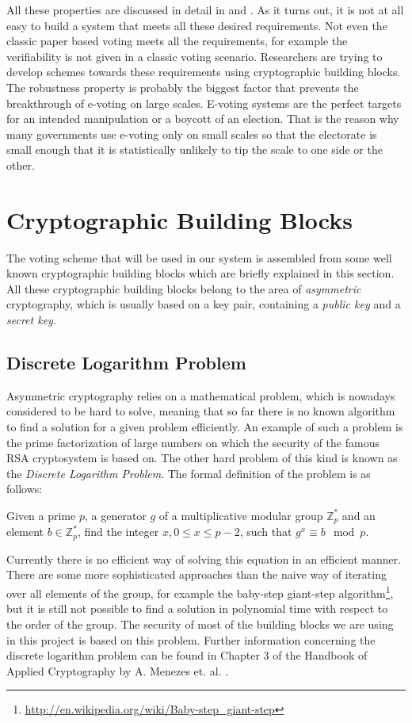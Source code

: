 \documentclass[numbers=noenddot, abstract=on, a4paper, headsepline,
footsepline, oneside, draft=off]{scrreprt}
\begin{document}
All these properties are discussed in detail in \cite{HS11} and \cite{Jonker09}.
As it turns out, it is not at all easy to build a system that meets all these
desired requirements. Not even the classic paper based voting meets all the
requirements, for example the verifiability is not given in a classic voting
scenario. Researchers are trying to develop schemes towards these requirements
using cryptographic building blocks. The robustness property is probably the
biggest factor that prevents the breakthrough of e-voting on large scales.
E-voting systems are the perfect targets for an intended manipulation or a
boycott of an election. That is the reason why many governments use e-voting
only on small scales so that the electorate is small enough that it is
statistically unlikely to tip the scale to one side or the other.

\section{Cryptographic Building Blocks}
\label{sec:buildingblocks}
The voting scheme that will be used in our system is assembled from some well
known cryptographic building blocks which are briefly explained in this section.
All these cryptographic building blocks belong to the area of \emph{asymmetric}
cryptography, which is usually based on a key pair, containing a
\emph{public key} and a \emph{secret key}.

\subsection{Discrete Logarithm Problem}
\label{sec:discretelogarithm}
Asymmetric cryptography relies on a mathematical problem, which is nowadays
considered to be hard to solve, meaning that so far there is no known algorithm
to find a solution for a given problem efficiently. An example of such a problem
is the prime factorization of large numbers on which the security of the famous
RSA cryptosystem \cite{RSA78} is based on. The other hard problem of this kind
is known as the \emph{Discrete Logarithm Problem}. The formal definition of
the problem is as follows: 

Given a prime $p$, a generator $g$ of a multiplicative modular group
$\mathbb{Z}^*_p$ and an element $b \in \mathbb{Z}^*_p$, find the integer $x,0
\leq x \leq p - 2$, such that $g^x \equiv b \mod p$.

Currently there is no efficient way of solving this equation in an efficient
manner. There are some more sophisticated approaches than the naive way of
iterating over all elements of the group, for example the baby-step giant-step
algorithm\footnote{\url{http://en.wikipedia.org/wiki/Baby-step_giant-step}}, but
it is still not possible to find a solution in polynomial time with respect to
the order of the group. The security of most of the building blocks we are using
in this project is based on this problem. Further information concerning the
discrete logarithm problem can be found in Chapter 3 of the Handbook of Applied
Cryptography by A. Menezes et. al.
\cite{book:hac}.
\end{document}
